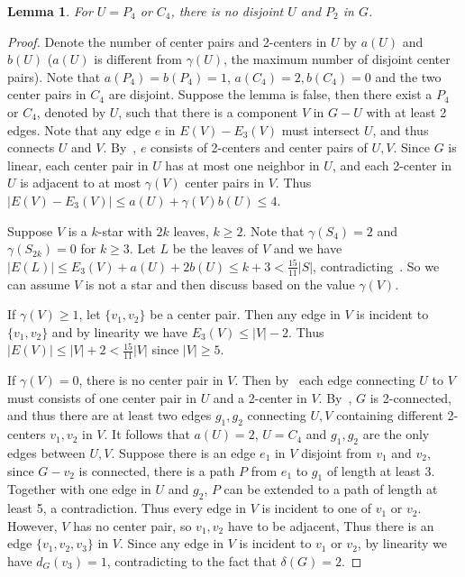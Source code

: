 \documentclass[a4paper]{article}
\newtheorem{lem}[thm]{Lemma}
\begin{document}
\begin{lem}\label{4P2}
	For $U=P_4$ or $C_4$, there is no disjoint $U$ and $P_2$ in $G$.
\end{lem}
\begin{proof}
    Denote the number of center pairs and 2-centers in $U$ by $a(U)$ and $b(U)$ ($a(U)$ is different from $\gamma(U)$, the maximum number of disjoint center pairs). Note that $a(P_4)=b(P_4)=1$, $a(C_4)=2, b(C_4)=0$ and the two center pairs in $C_4$ are disjoint.
	Suppose the lemma is false, then there exist a $P_4$ or $C_4$, denoted by $U$, such that there is a component $V$ in $G-U$ with at least 2 edges. Note that any edge $e$ in $E(V)-E_3(V)$ must intersect $U$, and thus connects $U$ and $V$. By~, $e$ consists of 2-centers and center pairs of $U,V$. Since $G$ is linear, each center pair in $U$ has at most one neighbor in $U$, and each 2-center in $U$ is adjacent to at most $\gamma(V)$ center pairs in $V$. Thus $|E(V)-E_3(V)|\le a(U)+\gamma(V)b(U)\leq 4$.
	
	Suppose $V$ is a $k$-star with $2k$ leaves, $k\ge 2$.
    Note that $\gamma(S_4)=2$ and $\gamma(S_{2k})=0$ for $k\geq 3$.
    Let $L$ be the leaves of $V$ and we have $|E(L)|\le E_3(V)+a(U)+2b(U)\leq k+3<\frac{15}{11}|S|$, contradicting~.
	So we can assume $V$ is not a star and then discuss based on the value $\gamma(V)$.

    If $\gamma(V)\geq 1$, let $\{v_1,v_2\}$ be a center pair. Then any edge in $V$ is incident to $\{v_1,v_2\}$ and by linearity we have $E_3(V)\leq |V|-2$. Thus $|E(V)|\leq |V|+2<\frac{15}{11}|V|$ since $|V|\geq 5$.
	
	If $\gamma(V) = 0$, there is no center pair in $V$. Then by~ each edge connecting $U$ to $V$ must consists of one center pair in $U$ and a 2-center in $V$.
    By~, $G$ is 2-connected, and thus there are at least two edges $g_1,g_2$ connecting $U,V$ containing different 2-centers $v_1,v_2$ in $V$. It follows that $a(U)= 2$, $U=C_4$ and $g_1,g_2$ are the only edges between $U,V$. Suppose there is an edge $e_1$ in $V$ disjoint from $v_1$ and $v_2$, since $G-v_2$ is connected, there is a path $P$ from $e_1$ to $g_1$ of length at least 3. Together with one edge in $U$ and $g_2$, $P$ can be extended to a path of length at least 5, a contradiction. Thus every edge in $V$ is incident to one of $v_1$ or $v_2$. However, $V$ has no center pair, so $v_1, v_2$ have to be adjacent, Thus there is an edge $\{v_1,v_2,v_3\}$ in $V$. Since any edge in $V$ is incident to $v_1$ or $v_2$, by linearity we have $d_G(v_3)=1$, contradicting to the fact that $\delta(G) = 2$.
\end{proof}
\end{document}

